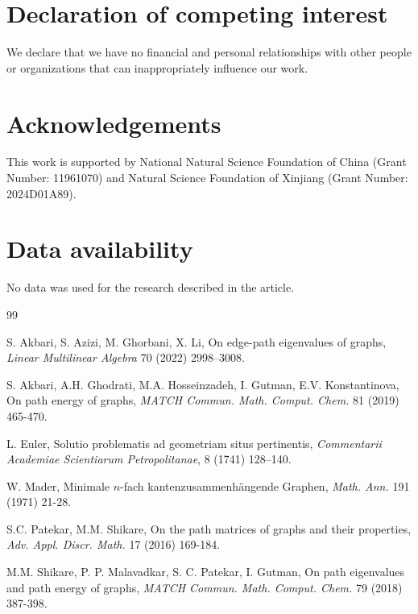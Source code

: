 \documentclass{article}
\begin{document}
\section*{Declaration of competing interest}
We declare that we have no financial and personal relationships with other people or organizations that can inappropriately influence our work.

\section*{Acknowledgements}
This work is supported by National Natural Science Foundation of China (Grant Number: 11961070) and Natural Science Foundation of Xinjiang (Grant Number: 2024D01A89).

\section*{Data availability}
No data was used for the research described in the article.

\begin{thebibliography}{99}

 S. Akbari, S. Azizi, M. Ghorbani, X. Li, On edge-path eigenvalues of graphs, {\it Linear Multilinear Algebra} 70 (2022) 2998–3008. 

 S. Akbari, A.H. Ghodrati, M.A. Hosseinzadeh, I. Gutman, E.V. Konstantinova, On path energy of graphs, {\it MATCH Commun. Math. Comput. Chem.} 81
(2019) 465-470.


 L. Euler, Solutio problematis ad geometriam situs pertinentis, {\it Commentarii Academiae Scientiarum Petropolitanae}, 8 (1741) 128--140.


 W. Mader, Minimale $n$-fach kantenzusammenh\"angende Graphen, {\it Math. Ann.} 191 (1971) 21-28.


 S.C. Patekar, M.M. Shikare, On the path matrices of graphs and their properties, {\it Adv. Appl. Discr. Math.} 17 (2016) 169-184.

 M.M. Shikare, P. P. Malavadkar, S. C. Patekar, I. Gutman, On path eigenvalues
and path energy of graphs, {\it MATCH Commun. Math. Comput. Chem.} 79 (2018) 387-398.



\end{thebibliography}
%
%


\
\end{document}
